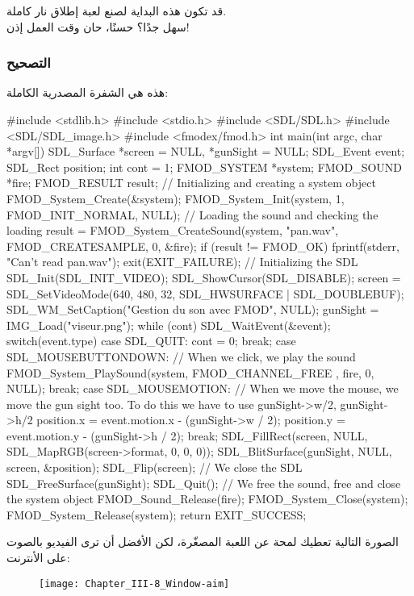 قد تكون هذه البداية لصنع لعبة إطلاق نار كاملة.\\
سهل جدًا؟ حسنًا، حان وقت العمل إذن!

\subsubsection{التصحيح}

هذه هي الشفرة المصدرية الكاملة:

\begin{Csource}
#include <stdlib.h>
#include <stdio.h>
#include <SDL/SDL.h>
#include <SDL/SDL_image.h>
#include <fmodex/fmod.h>
int main(int argc, char *argv[])
{
	SDL_Surface *screen = NULL, *gunSight = NULL;
	SDL_Event event;
	SDL_Rect position;
	int cont = 1;
	FMOD_SYSTEM *system;
	FMOD_SOUND *fire;
	FMOD_RESULT result;
	// Initializing and creating a system object
	FMOD_System_Create(&system);
	FMOD_System_Init(system, 1, FMOD_INIT_NORMAL, NULL);
	// Loading the sound and checking the loading
	result = FMOD_System_CreateSound(system, "pan.wav", FMOD_CREATESAMPLE, 0, &fire);
	if (result != FMOD_OK)
	{
		fprintf(stderr, "Can't read pan.wav\n");
		exit(EXIT_FAILURE);
	}
	// Initializing the SDL
	SDL_Init(SDL_INIT_VIDEO);
	SDL_ShowCursor(SDL_DISABLE);
	screen = SDL_SetVideoMode(640, 480, 32, SDL_HWSURFACE | SDL_DOUBLEBUF);
	SDL_WM_SetCaption("Gestion du son avec FMOD", NULL);
	gunSight = IMG_Load("viseur.png");
	while (cont)
	{
		SDL_WaitEvent(&event);
		switch(event.type)
		{
			case SDL_QUIT:
			cont = 0;
			break;
			case SDL_MOUSEBUTTONDOWN:
			// When we click, we play the sound
			FMOD_System_PlaySound(system, FMOD_CHANNEL_FREE , fire, 0, NULL);
			break;
			case SDL_MOUSEMOTION:
			// When we move the mouse, we move the gun sight too. To do this we have to use gunSight->w/2, gunSight->h/2
			position.x = event.motion.x - (gunSight->w / 2);
			position.y = event.motion.y - (gunSight->h / 2);
			break;
		}
		SDL_FillRect(screen, NULL, SDL_MapRGB(screen->format, 0, 0, 0));
		SDL_BlitSurface(gunSight, NULL, screen, &position);
		SDL_Flip(screen);
	}	
	// We close the SDL
	SDL_FreeSurface(gunSight);
	SDL_Quit();
	// We free the sound, free and close the system object
	FMOD_Sound_Release(fire);
	FMOD_System_Close(system);
	FMOD_System_Release(system);
	return EXIT_SUCCESS;
}
\end{Csource}

الصورة التالية تعطيك لمحة عن اللعبة المصغّرة، لكن الأفضل أن ترى الفيديو بالصوت على الأنترنت:

\begin{figure}[H]
	\centering
	\texttt{[image: Chapter\_III-8\_Window-aim]}
\end{figure}

